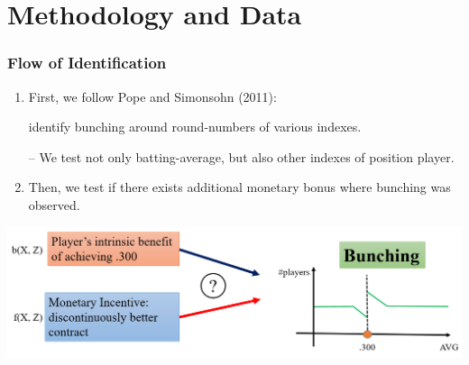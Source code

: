 \documentclass[dvipdfmx,12pt]{beamer}
\begin{document}
\section{Methodology and Data}
\begin{frame}\frametitle{Flow of Identification}
  \begin{enumerate}
    \item First, we follow Pope and Simonsohn (2011):

    identify bunching around round-numbers of various indexes.

    -- We test not only batting-average, but also other indexes of position player.

    \item Then, we test if there exists additional monetary bonus where bunching was observed.
  \end{enumerate}
  \begin{center}
    \includegraphics[keepaspectratio, scale=0.5]{output/bunching_visualize_3.png}
  \end{center}
\end{frame}
\end{document}
